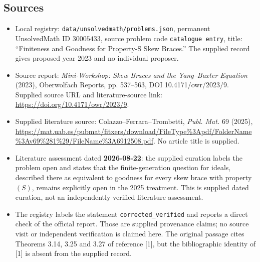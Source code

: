\documentclass[11pt]{article}
\begin{document}
\subsection{Sources}
\begin{itemize}
\item Local registry: \texttt{data/unsolvedmath/problems.json}, permanent UnsolvedMath ID \(30005433\), source problem code \texttt{catalogue entry}, title: ``Finiteness and Goodness for Property-S Skew Braces.'' The supplied record gives proposed year 2023 and no individual proposer.
\item Source report: \emph{Mini-Workshop: Skew Braces and the Yang--Baxter Equation} (2023), Oberwolfach Reports, pp. 537--563, DOI 10.4171/owr/2023/9. Supplied source URL and literature-source link: \url{https://doi.org/10.4171/owr/2023/9}.
\item Supplied literature source: Colazzo--Ferrara--Trombetti, \emph{Publ. Mat.} 69 (2025), \url{https://mat.uab.es/pubmat/fitxers/download/FileType%3Apdf/FolderName%3Av69%281%29/FileName%3A6912508.pdf}. No article title is supplied.
\item Literature assessment dated \textbf{2026-08-22}: the supplied curation labels the problem open and states that the finite-generation question for ideals, described there as equivalent to goodness for every skew brace with property \((S)\), remains explicitly open in the 2025 treatment. This is supplied dated curation, not an independently verified literature assessment.
\item The registry labels the statement \texttt{corrected\_verified} and reports a direct check of the official report. Those are supplied provenance claims; no source visit or independent verification is claimed here. The original passage cites Theorems 3.14, 3.25 and 3.27 of reference [1], but the bibliographic identity of [1] is absent from the supplied record.
\end{itemize}
\end{document}

